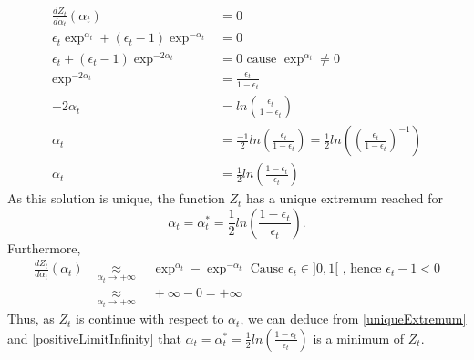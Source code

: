 \documentclass[12pt]{article}											%
\begin{document}
	\begin{equation}
	\begin{aligned}
		\frac{dZ_t}{d\alpha_t} (\alpha_t)																  &= 0\\
		\epsilon_t \exp^{\alpha_t} + (\epsilon_t - 1) \exp^{- \alpha_t}	  &= 0\\
		\epsilon_t + (\epsilon_t - 1) \exp^{-2 \alpha_t}									&= 0 \mbox{ cause } \exp^{\alpha_t} \neq 0\\
        \exp^{-2 \alpha_t}																									&= \frac{\epsilon_t }{1 - \epsilon_t }\\
        -2 \alpha_t																													&= ln(\frac{\epsilon_t }{1 - \epsilon_t })\\
        \alpha_t																													  &= \frac{-1}{2} ln(\frac{\epsilon_t }{1 - \epsilon_t })  = \frac{1}{2} ln((\frac{\epsilon_t }{1 - \epsilon_t })^{-1}) \\
        \alpha_t																													  &= \frac{1}{2} ln(\frac{1-\epsilon_t }{\epsilon_t })
	\end{aligned}
	\end{equation}
As this solution is unique, the function $Z_t$ has a unique extremum reached for 
\begin{equation}
	\alpha_t = \alpha_t^* = \frac{1}{2} ln(\frac{1-\epsilon_t }{\epsilon_t })
    \label{uniqueExtremum}. 
\end{equation}
Furthermore, 
	\begin{equation}
	\begin{aligned}
		\frac{dZ_t}{d\alpha_t} (\alpha_t)  & \underset{\alpha_t \rightarrow + \infty}{\approx} \quad \exp^{\alpha_t} - \exp^{- \alpha_t} \mbox{ Cause } \epsilon_t \in ]0, 1[ \mbox{ , hence } \epsilon_t -1 < 0\\
			&\underset{\alpha_t \rightarrow + \infty}{\approx} \quad +\infty - 0 = +\infty
		\label{positiveLimitInfinity}
	\end{aligned}
	\end{equation}
Thus, as $Z_t$ is continue with respect to $\alpha_t$, we can deduce from \ref{uniqueExtremum} and \ref{positiveLimitInfinity} that $\alpha_t = \alpha_t^* = \frac{1}{2} ln(\frac{1-\epsilon_t }{\epsilon_t })$ is a minimum of $Z_t$.










\end{document}

